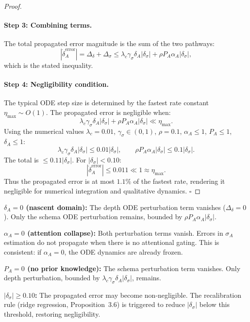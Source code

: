 \begin{proof}
\paragraph{Step 3: Combining terms.}
The total propagated error magnitude is the sum of the two pathways:
\[
|\dot{\delta}_A^{\text{error}}| = \Delta_{\delta} + \Delta_{\sigma}
\leq \lambda_c \gamma_\sigma \delta_A |\delta_\sigma|
+ \rho P_A \alpha_A |\delta_\sigma|,
\]
which is the stated inequality.

\paragraph{Step 4: Negligibility condition.}
The typical ODE step size is determined by the fastest rate constant
$\eta_{\max} \sim O(1)$. The propagated error is negligible when:
\[
\lambda_c \gamma_\sigma \delta_A |\delta_\sigma|
+ \rho P_A \alpha_A |\delta_\sigma| \ll \eta_{\max}.
\]
Using the numerical values $\lambda_c = 0.01$, $\gamma_\sigma \in (0,1)$,
$\rho = 0.1$, $\alpha_A \leq 1$, $P_A \leq 1$, $\delta_A \leq 1$:
\[
\lambda_c \gamma_\sigma \delta_A |\delta_\sigma| \leq 0.01 |\delta_\sigma|,
\qquad
\rho P_A \alpha_A |\delta_\sigma| \leq 0.1 |\delta_\sigma|.
\]
The total is $\leq 0.11 |\delta_\sigma|$. For $|\delta_\sigma| < 0.10$:
\[
|\dot{\delta}_A^{\text{error}}| \leq 0.011 \ll 1 \approx \eta_{\max}.
\]
Thus the propagated error is at most $1.1\%$ of the fastest rate,
rendering it negligible for numerical integration and qualitative
dynamics. $\square$
\end{proof}

\begin{boundary-case}
\textbf{$\delta_A = 0$ (nascent domain):}
The depth ODE perturbation term vanishes ($\Delta_{\delta} = 0$).
Only the schema ODE perturbation remains, bounded by
$\rho P_A \alpha_A |\delta_\sigma|$.

\textbf{$\alpha_A = 0$ (attention collapse):}
Both perturbation terms vanish. Errors in $\sigma_A$ estimation
do not propagate when there is no attentional gating. This is
consistent: if $\alpha_A = 0$, the ODE dynamics are already
frozen.

\textbf{$P_A = 0$ (no prior knowledge):}
The schema perturbation term vanishes. Only depth perturbation,
bounded by $\lambda_c \gamma_\sigma \delta_A |\delta_\sigma|$, remains.

\textbf{$|\delta_\sigma| \geq 0.10$:}
The propagated error may become non-negligible. The recalibration
rule (ridge regression, Proposition~3.6) is triggered to reduce
$|\delta_\sigma|$ below this threshold, restoring negligibility.
\end{boundary-case}

